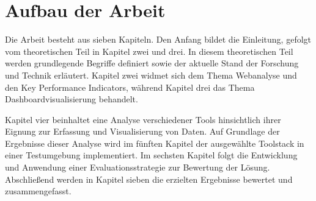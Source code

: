 \section{Aufbau der Arbeit}
\label{sec:aufbau}
Die Arbeit besteht aus sieben Kapiteln. Den Anfang bildet die Einleitung, gefolgt vom theoretischen Teil in Kapitel zwei und drei. In diesem theoretischen Teil werden grundlegende Begriffe definiert sowie der aktuelle Stand der Forschung und Technik erläutert. Kapitel zwei widmet sich dem Thema Webanalyse und den Key Performance Indicators, während Kapitel drei das Thema Dashboardvisualisierung behandelt.

Kapitel vier beinhaltet eine Analyse verschiedener Tools hinsichtlich ihrer Eignung zur Erfassung und Visualisierung von Daten. Auf Grundlage der Ergebnisse dieser Analyse wird im fünften Kapitel der ausgewählte Toolstack in einer Testumgebung implementiert. Im sechsten Kapitel folgt die Entwicklung und Anwendung einer Evaluationsstrategie zur Bewertung der Lösung. Abschließend werden in Kapitel sieben die erzielten Ergebnisse bewertet und zusammengefasst.